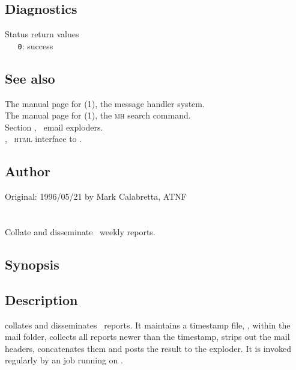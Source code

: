 \subsection*{Diagnostics}

Status return values
\\ \verb+   0+: success

\subsection*{See also}

The manual page for (1), the message handler system.\\
The manual page for (1), the \textsc{mh} search command.\\
Section , \aipspp\ email exploders.\\
, \aipspp\ \textsc{html} interface to .

\subsection*{Author}

Original: 1996/05/21 by Mark Calabretta, ATNF


\newpage
\section{}
\label{reap}



Collate and disseminate \aipspp\ weekly reports.

\subsection*{Synopsis}
 
\begin{synopsis}
\end{synopsis}
 
\subsection*{Description}
 
 collates and disseminates \aipspp\ reports.  It maintains a
timestamp file, , within the \mbox{} mail
folder, collects all reports newer than the timestamp, strips out the mail
headers, concatenates them and posts the result to the
\mbox{} exploder.  It is invoked regularly by an
  job running on .

